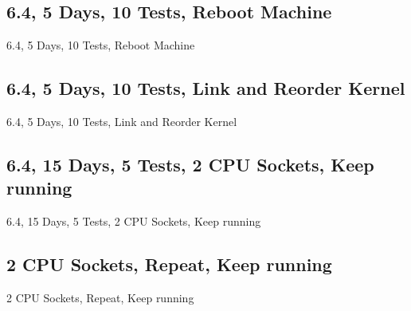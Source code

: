 \documentclass[14pt,aspectratio=169]{beamer}
\begin{document}
\subsection{6.4, 5 Days, 10 Tests, Reboot Machine}
\begin{frame}{6.4, 5 Days, 10 Tests, Reboot Machine}
    \begin{adjustbox}{totalheight=\baselineskip}
	
    \end{adjustbox}
\end{frame}

\subsection{6.4, 5 Days, 10 Tests, Link and Reorder Kernel}
\begin{frame}{6.4, 5 Days, 10 Tests, Link and Reorder Kernel}
    \begin{adjustbox}{totalheight=\baselineskip}
	
    \end{adjustbox}
\end{frame}

\subsection{6.4, 15 Days, 5 Tests, 2 CPU Sockets, Keep running}
\begin{frame}{6.4, 15 Days, 5 Tests, 2 CPU Sockets, Keep running}
    \begin{adjustbox}{totalheight=\baselineskip}
	
    \end{adjustbox}
\end{frame}

\subsection{2 CPU Sockets, Repeat, Keep running}
\begin{frame}{2 CPU Sockets, Repeat, Keep running}
\end{frame}
\end{document}
